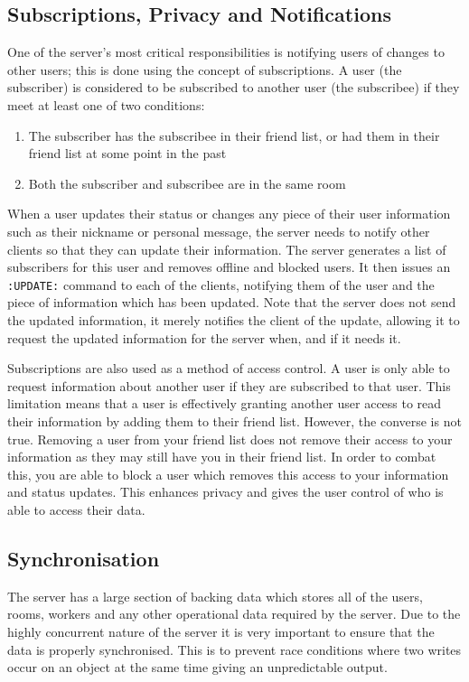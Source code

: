 \subsection{Subscriptions, Privacy and Notifications}
One of the server's most critical responsibilities is notifying users of changes to other users; this is done using the concept of subscriptions.  A user (the subscriber) is considered to be subscribed to another user (the subscribee) if they meet at least one of two conditions:

\begin{enumerate}
\item{The subscriber has the subscribee in their friend list, or had them in their friend list at some point in the past}
\item{Both the subscriber and subscribee are in the same room}
\end{enumerate}

When a user updates their status or changes any piece of their user information such as their nickname or personal message, the server needs to notify other clients so that they can update their information. The server generates a list of subscribers for this user and removes offline and blocked users. It then issues an \texttt{:UPDATE:} command to each of the clients, notifying them of the user and the piece of information which has been updated. Note that the server does not send the updated information, it merely notifies the client of the update, allowing it to request the updated information for the server when, and if it needs it.

Subscriptions are also used as a method of access control. A user is only able to request information about another user if they are subscribed to that user. This limitation means that a user is effectively granting another user access to read their information by adding them to their friend list. However, the converse is not true. Removing a user from your friend list does not remove their access to your information as they may still have you in their friend list. In order to combat this, you are able to block a user which removes this access to your information and status updates. This enhances privacy and gives the user control of who is able to access their data.

\subsection{Synchronisation}
The server has a large section of backing data which stores all of the users, rooms, workers and any other operational data required by the server. Due to the highly concurrent nature of the server it is very important to ensure that the data is properly synchronised. This is to prevent race conditions where two writes occur on an object at the same time giving an unpredictable output. 

